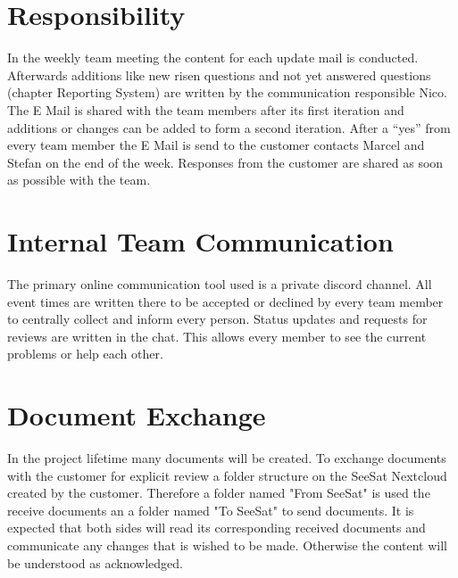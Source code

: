 \section{Responsibility}
In the weekly team meeting the content for each update mail is conducted. Afterwards additions like new risen questions and not yet answered questions (chapter Reporting System) are written by the communication responsible Nico. The E Mail is shared with the team members after its first iteration and additions or changes can be added to form a second iteration. After a “yes” from every team member the E Mail is send to the customer contacts Marcel and Stefan on the end of the week. Responses from the customer are shared as soon as possible with the team.

\section{Internal Team Communication}
The primary online communication tool used is a private discord channel. All event times are written there to be accepted or declined by every team member to centrally collect and inform every person. Status updates and requests for reviews are written in the chat. This allows every member to see the current problems or help each other.

\section{Document Exchange}
In the project lifetime many documents will be created. To exchange documents with the customer for explicit review a folder structure on the SeeSat Nextcloud created by the customer. Therefore a folder named "From SeeSat" is used the receive documents an a folder named "To SeeSat" to send documents. It is expected that both sides will read its corresponding received documents and communicate any changes that is wished to be made. Otherwise the content will be understood as acknowledged.